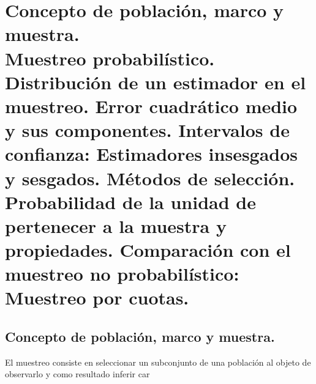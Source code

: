 
\chapter[Concepto de poblaci\'on, marco y muestra.]{Concepto de poblaci\'on, marco y muestra.\\
	\normalsize Muestreo probabil\'istico. Distribuci\'on de un estimador en el muestreo. Error cuadr\'atico medio y sus componentes. Intervalos de confianza: Estimadores insesgados y sesgados. M\'etodos de selecci\'on. Probabilidad de la unidad de pertenecer a la muestra y propiedades. Comparaci\'on con el muestreo no probabil\'istico: Muestreo por cuotas.}

\section{Concepto de poblaci\'on, marco y muestra.}

El muestreo consiste en seleccionar un subconjunto de una poblaci\'on al objeto de observarlo y como resultado inferir car

